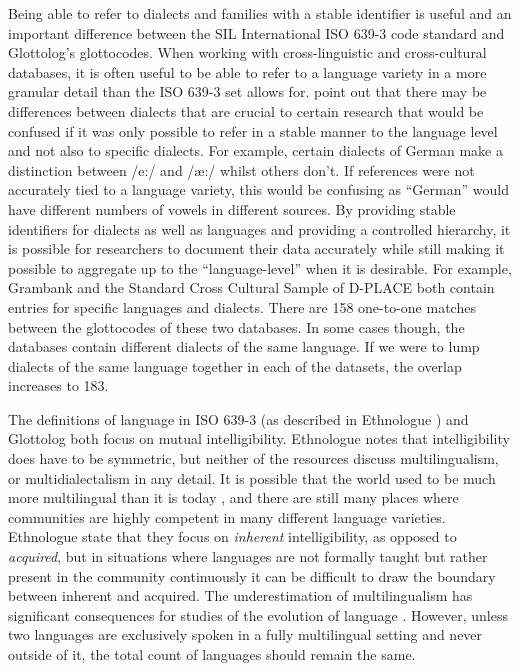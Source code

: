 \documentclass[12pt,letterpaper]{article}
\begin{document}

Being able to refer to dialects and families with a stable identifier is useful and an important difference between the SIL International ISO 639-3 code standard and Glottolog's glottocodes. When working with cross-linguistic and cross-cultural databases, it is often useful to be able to refer to a language variety in a more granular detail than the ISO 639-3 set allows for. \citet{nordhoff2011glottolog} point out that there may be differences between dialects that are crucial to certain research that would be confused if it was only possible to refer in a stable manner to the language level and not also to specific dialects. For example, certain dialects of German make a distinction between /e:/ and /æ:/ whilst others don't. If references were not accurately tied to a language variety, this would be confusing as ``German'' would have different numbers of vowels in different sources. By providing stable identifiers for dialects as well as languages and providing a controlled hierarchy, it is possible for researchers to document their data accurately while still making it possible to aggregate up to the ``language-level'' when it is desirable. For example, Grambank and the Standard Cross Cultural Sample of D-PLACE both contain entries for specific languages and dialects. There are 158 one-to-one matches between the glottocodes of these two databases. In some cases though, the databases contain different dialects of the same language. If we were to lump dialects of the same language together in each of the datasets, the overlap increases to 183.

The definitions of language in ISO 639-3 (as described in Ethnologue \citep{ethnologue2019lgident}) and Glottolog both focus on mutual intelligibility. Ethnologue notes that intelligibility does have to be symmetric, but neither of the resources discuss multilingualism, or multidialectalism in any detail. It is possible that the world used to be much more multilingual than it is today \citep{evans2017did}, and there are still many places where communities are highly competent in many different language varieties. Ethnologue state that they focus on \emph{inherent} intelligibility, as opposed to \emph{acquired}, but in situations where languages are not formally taught but rather present in the community continuously it can be difficult to draw the boundary between inherent and acquired. The underestimation of multilingualism has significant consequences for studies of the evolution of language \citep{roberts2013evolutionary}. However, unless two languages are exclusively spoken in a fully multilingual setting and never outside of it, the total count of languages should remain the same. 
\end{document}
